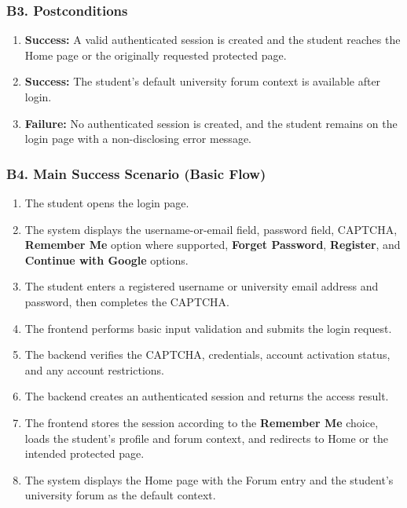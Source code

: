 \documentclass[12pt]{article}
\begin{document}
\hypertarget{sec:b3-postconditions}{}
\subsubsection*{B3. Postconditions}
\par\medskip

\begin{enumerate}
\item \textbf{Success:} A valid authenticated session is created and the student reaches the Home page or the originally requested protected page.
\item \textbf{Success:} The student's default university forum context is available after login.
\item \textbf{Failure:} No authenticated session is created, and the student remains on the login page with a non-disclosing error message.
\end{enumerate}
\par\medskip

\hypertarget{sec:b4-main-success-scenario-basic-flow}{}
\subsubsection*{B4. Main Success Scenario (Basic Flow)}
\par\medskip

\begin{enumerate}
\item The student opens the login page.
\item The system displays the username-or-email field, password field, CAPTCHA, \textbf{Remember Me} option where supported, \textbf{Forget Password}, \textbf{Register}, and \textbf{Continue with Google} options.
\item The student enters a registered username or university email address and password, then completes the CAPTCHA.
\item The frontend performs basic input validation and submits the login request.
\item The backend verifies the CAPTCHA, credentials, account activation status, and any account restrictions.
\item The backend creates an authenticated session and returns the access result.
\item The frontend stores the session according to the \textbf{Remember Me} choice, loads the student's profile and forum context, and redirects to Home or the intended protected page.
\item The system displays the Home page with the Forum entry and the student's university forum as the default context.
\end{enumerate}
\par\medskip
\end{document}
